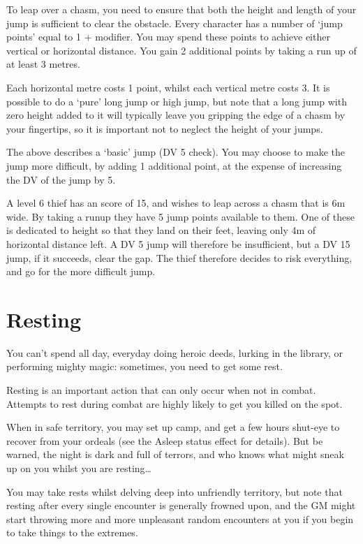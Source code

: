 To leap over a chasm, you need to ensure that both the height and length of your jump is sufficient to clear the obstacle. Every character has a number of `jump points' equal to 1 + \attPhys{} modifier. You may spend these points to achieve either vertical or horizontal distance. You gain 2 additional points by taking a run up of at least 3 metres. 

Each horizontal metre costs 1 point, whilst each vertical metre costs 3.  It is possible to do a `pure' long jump or high jump, but note that a long jump with zero height added to it will typically leave you gripping the edge of a chasm by your fingertips, so it is important not to neglect the height of your jumps. 

The above describes a `basic' jump (DV 5 \attPhysShort{} check). You may choose to make the jump more difficult, by adding 1 additional point, at the expense of increasing the DV of the jump by 5. 

A level 6 thief has an \attPhys{} score of 15, and wishes to leap across a chasm that is 6m wide. By taking a runup they have 5 jump points available to them. One of these is dedicated to height so that they land on their feet, leaving only 4m of horizontal distance left. A DV 5 jump will therefore be insufficient, but a DV 15 jump, if it succeeds, clear the gap. The thief therefore decides to risk everything, and go for the more difficult jump. 




\section{Resting}

You can't spend all day, everyday doing heroic deeds, lurking in the library, or performing mighty magic: sometimes, you need to get some rest. 

Resting is an important action that can only occur when not in combat. Attempts to rest during combat are highly likely to get you killed on the spot. 

When in safe territory, you may set up camp, and get a few hours shut-eye to recover from your ordeals (see the Asleep status effect for details). But be warned, the night is dark and full of terrors, and who knows what might sneak up on you whilst you are resting…

You may take rests whilst delving deep into unfriendly territory, but note that resting after every single encounter is generally frowned upon, and the GM might start throwing more and more unpleasant random encounters at you if you begin to take things to the extremes. 

